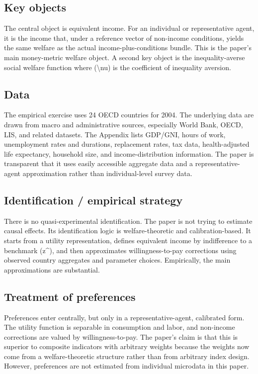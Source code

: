 \documentclass[11pt,a4paper]{article}
\begin{document}
\subsection*{Key objects}
The central object is equivalent income. For an individual or representative agent, it is the income that, under a reference vector of non-income conditions, yields the same welfare as the actual income-plus-conditions bundle. This is the paper’s main money-metric welfare object. A second key object is the inequality-averse social welfare function where (\textbackslash{}nu) is the coefficient of inequality aversion.

\subsection*{Data}
The empirical exercise uses 24 OECD countries for 2004. The underlying data are drawn from macro and administrative sources, especially World Bank, OECD, LIS, and related datasets. The Appendix lists GDP/GNI, hours of work, unemployment rates and durations, replacement rates, tax data, health-adjusted life expectancy, household size, and income-distribution information. The paper is transparent that it uses easily accessible aggregate data and a representative-agent approximation rather than individual-level survey data.

\subsection*{Identification / empirical strategy}
There is no quasi-experimental identification. The paper is not trying to estimate causal effects. Its identification logic is welfare-theoretic and calibration-based. It starts from a utility representation, defines equivalent income by indifference to a benchmark (z\textasciicircum{}), and then approximates willingness-to-pay corrections using observed country aggregates and parameter choices. Empirically, the main approximations are substantial.

\subsection*{Treatment of preferences}
Preferences enter centrally, but only in a representative-agent, calibrated form. The utility function is separable in consumption and labor, and non-income corrections are valued by willingness-to-pay. The paper’s claim is that this is superior to composite indicators with arbitrary weights because the weights now come from a welfare-theoretic structure rather than from arbitrary index design. However, preferences are not estimated from individual microdata in this paper.
\end{document}
